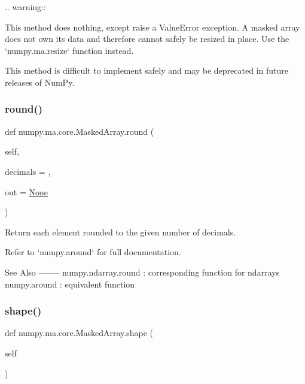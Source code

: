 \begin{DoxyVerb}.. warning::

    This method does nothing, except raise a ValueError exception. A
    masked array does not own its data and therefore cannot safely be
    resized in place. Use the `numpy.ma.resize` function instead.

This method is difficult to implement safely and may be deprecated in
future releases of NumPy.\end{DoxyVerb}
 \mbox{\label{classnumpy_1_1ma_1_1core_1_1MaskedArray_aff0f2bd262807929b3af0e0323b4b259}} 
\subsubsection{\texorpdfstring{round()}{round()}}
{\footnotesize\ttfamily def numpy.\+ma.\+core.\+Masked\+Array.\+round (\begin{DoxyParamCaption}\item[{}]{self,  }\item[{}]{decimals = {},  }\item[{}]{out = {\ttfamily \hyperlink{namespacenumpy_1_1ma_1_1core_a647ee1848dfa3692fe35a663a2aa40b3}{None}} }\end{DoxyParamCaption})}

\begin{DoxyVerb}Return each element rounded to the given number of decimals.

Refer to `numpy.around` for full documentation.

See Also
--------
numpy.ndarray.round : corresponding function for ndarrays
numpy.around : equivalent function
\end{DoxyVerb}
 \mbox{\label{classnumpy_1_1ma_1_1core_1_1MaskedArray_a87383f74cb220d0480cb83f44ffe8ac6}} 
\subsubsection{\texorpdfstring{shape()}{shape()}\hspace{0.1cm}{\footnotesize\ttfamily [1/2]}}
{\footnotesize\ttfamily def numpy.\+ma.\+core.\+Masked\+Array.\+shape (\begin{DoxyParamCaption}\item[{}]{self }\end{DoxyParamCaption})}

